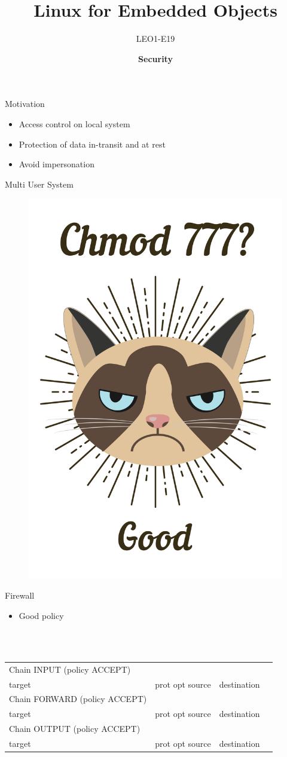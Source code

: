 \documentclass[aspectratio=169,10pt,t]{beamer}
\title{Linux for Embedded Objects}
\subtitle{LEO1-E19}
\date{ }
\author{
  \textbf{Security}
}
\institute[
  SDU Robotics\\
  The Maersk Mc-Kinney Moller Institute\\
  University of Southern Denmark
] %
{%
  The Maersk Mc-Kinney Moller Institute\\
  University of Southern Denmark

}
\begin{document}
{\SDUwavesbg%
\begin{frame} %
  \titlepage
\end{frame}}


\begin{frame}[t]{Motivation}
    \begin{itemize}
        \item Access control on local system
        \item Protection of data in-transit and at rest 
        \item Avoid impersonation
    \end{itemize}  
\end{frame}

\begin{frame}[t]{Multi User System}
	\vspace{-0.4cm}
	\begin{figure}[h]
		\centering
		\includegraphics[width=0.35\linewidth]{Img/grumpy-chmod-777.png}
	\end{figure}
\end{frame}

\begin{frame}[t]{Firewall}
    \begin{itemize}
        \item Good policy
\end{itemize}

\\

\tt
\begin{tabular}{*{4}{l}}
Chain INPUT (policy ACCEPT)&&&\\
target&prot opt source&destination&\\

Chain FORWARD (policy ACCEPT)\\
target&prot opt source&destination&\\

Chain OUTPUT (policy ACCEPT)\\
target&prot opt source&destination&\\
\end{tabular}

\end{frame}
\end{document}
